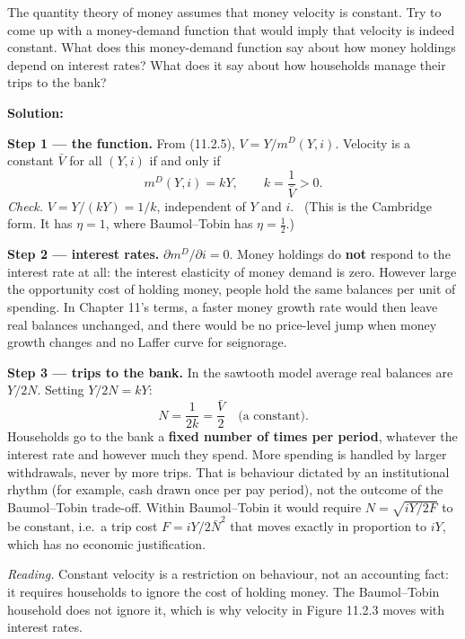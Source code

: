\documentclass[12pt, letterpaper]{article}
\newcommand{\mD}{m^{D}}
\begin{document}
\begin{tcolorbox}[evenbox,title={Problem 11.2 \quad The Quantity Theory}]
\begin{tcolorbox}[questionbox]
The quantity theory of money assumes that money velocity is constant. Try to come up with a
money-demand function that would imply that velocity is indeed constant. What does this
money-demand function say about how money holdings depend on interest rates? What does it say
about how households manage their trips to the bank?
\end{tcolorbox}

\textbf{Solution:}

\textbf{Step 1 --- the function.} From (11.2.5), $V=Y/\mD(Y,i)$. Velocity is a constant $\bar V$
for all $(Y,i)$ if and only if
\[
\boxed{\mD(Y,i)=kY,\qquad k=\frac{1}{\bar V}>0.}
\]
\emph{Check.} $V=Y/(kY)=1/k$, independent of $Y$ and $i$. \checkmark\ (This is the Cambridge
form. It has $\eta=1$, where Baumol--Tobin has $\eta=\tfrac12$.)

\textbf{Step 2 --- interest rates.} $\partial\mD/\partial i=0$. Money holdings do \textbf{not}
respond to the interest rate at all: the interest elasticity of money demand is zero. However
large the opportunity cost of holding money, people hold the same balances per unit of
spending. In Chapter 11's terms, a faster money growth rate would then leave real balances
unchanged, and there would be no price-level jump when money growth changes and no Laffer
curve for seignorage.

\textbf{Step 3 --- trips to the bank.} In the sawtooth model average real balances are
$Y/2N$. Setting $Y/2N=kY$:
\[
N=\frac{1}{2k}=\frac{\bar V}{2}\quad\text{(a constant)}.
\]
Households go to the bank a \textbf{fixed number of times per period}, whatever the interest
rate and however much they spend. More spending is handled by larger withdrawals, never by
more trips. That is behaviour dictated by an institutional rhythm (for example, cash drawn
once per pay period), not the outcome of the Baumol--Tobin trade-off. Within Baumol--Tobin it
would require $N=\sqrt{iY/2F}$ to be constant, i.e.\ a trip cost
$F=iY/2\bar N^{2}$ that moves exactly in proportion to $iY$, which has no economic
justification.

\emph{Reading.} Constant velocity is a restriction on behaviour, not an accounting fact:
it requires households to ignore the cost of holding money. The Baumol--Tobin household does
not ignore it, which is why velocity in Figure 11.2.3 moves with interest rates.
\end{tcolorbox}
\end{document}
